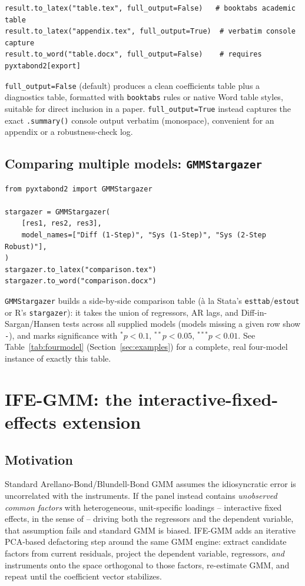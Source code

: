 \documentclass[11pt,a4paper]{article}
\begin{document}
\begin{lstlisting}[style=pystyle]
result.to_latex("table.tex", full_output=False)   # booktabs academic table
result.to_latex("appendix.tex", full_output=True)  # verbatim console capture
result.to_word("table.docx", full_output=False)    # requires pyxtabond2[export]
\end{lstlisting}

\texttt{full\_output=False} (default) produces a clean coefficients table
plus a diagnostics table, formatted with \texttt{booktabs} rules or native
Word table styles, suitable for direct inclusion in a paper. \texttt{full\_output=True}
instead captures the exact \texttt{.summary()} console output verbatim
(monospace), convenient for an appendix or a robustness-check log.

\subsection{Comparing multiple models: \texttt{GMMStargazer}}

\begin{lstlisting}[style=pystyle]
from pyxtabond2 import GMMStargazer

stargazer = GMMStargazer(
    [res1, res2, res3],
    model_names=["Diff (1-Step)", "Sys (1-Step)", "Sys (2-Step Robust)"],
)
stargazer.to_latex("comparison.tex")
stargazer.to_word("comparison.docx")
\end{lstlisting}

\texttt{GMMStargazer} builds a side-by-side comparison table (à la Stata's
\texttt{esttab}/\texttt{estout} or R's \texttt{stargazer}): it takes the
union of regressors, AR lags, and Diff-in-Sargan/Hansen tests across all
supplied models (models missing a given row show \texttt{-}), and marks
significance with $^{*}p{<}0.1$, $^{**}p{<}0.05$, $^{***}p{<}0.01$. See
Table~\ref{tab:fourmodel} (Section~\ref{sec:examples}) for a complete,
real four-model instance of exactly this table.

\section{IFE-GMM: the interactive-fixed-effects extension}
\label{sec:ife}

\subsection{Motivation}

Standard Arellano-Bond/Blundell-Bond GMM assumes the idiosyncratic error is
uncorrelated with the instruments. If the panel instead contains
\emph{unobserved common factors} with heterogeneous, unit-specific loadings
-- interactive fixed effects, in the sense of \citet{Bai2009} -- driving
both the regressors and the dependent variable, that assumption fails and
standard GMM is biased. IFE-GMM adds an iterative PCA-based defactoring step
around the same GMM engine: extract candidate factors from current
residuals, project the dependent variable, regressors, \emph{and}
instruments onto the space orthogonal to those factors, re-estimate GMM, and
repeat until the coefficient vector stabilizes.
\end{document}
